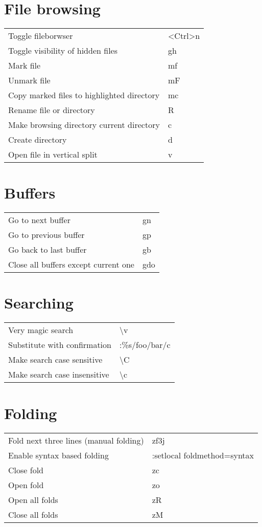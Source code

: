 \documentclass[a4paper]{report}
\def \tablewidth {10cm}
\begin{document}
\section{File browsing}
\begin{tabularx}{\tablewidth}{| X | l |}
  \hline
  Toggle fileborwser & \textless Ctrl\textgreater n \\
  Toggle visibility of hidden files & gh \\
  Mark file & mf \\
  Unmark file & mF \\
  Copy marked files to highlighted directory & mc \\
  Rename file or directory & R \\
  Make browsing directory current directory & c \\
  Create directory & d \\
  Open file in vertical split & v \\

  \hline
\end{tabularx}

\section{Buffers}
\begin{tabularx}{\tablewidth}{| X | l |}
  \hline
  Go to next buffer & gn \\
  Go to previous buffer & gp \\
  Go back to last buffer & gb \\
  Close all buffers except current one & gdo \\
  \hline
\end{tabularx}

\section{Searching}
\begin{tabularx}{\tablewidth}{| X | l |}
  \hline
  Very magic search & \textbackslash v \\
  Substitute with confirmation & :\%s/foo/bar/c \\
  Make search case sensitive & \textbackslash C \\
  Make search case insensitive & \textbackslash c \\
  \hline
\end{tabularx}

\section{Folding}
\begin{tabularx}{\tablewidth}{| X | l |}
  \hline
  Fold next three lines (manual folding) & zf3j \\
  Enable syntax based folding & :setlocal foldmethod=syntax \\
  Close fold & zc \\
  Open fold & zo \\
  Open all folds & zR \\
  Close all folds & zM \\
  \hline
\end{tabularx}
\end{document}
